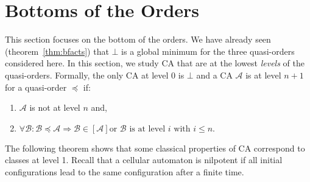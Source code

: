 \documentclass[a4paper]{elsarticle}
\newcommand{\ACA}{\mathcal{A}}
\newcommand{\ACB}{\mathcal{B}}
\newcommand{\simu}{\preccurlyeq}
\newcommand{\simc}[1]{\left[{#1}\right]}
\newcommand\sing{\bot}
\begin{document}
\section{Bottoms of the Orders}
\label{sec:bot}

This section focuses on the bottom of the orders.  We have already
seen (theorem~\ref{thm:bfacts}) that $\sing$ is a global minimum for
the three quasi-orders considered here. In this section, we study CA
that are at the lowest \emph{levels} of the quasi-orders.  Formally,
the only CA at level $0$ is $\sing$ and a CA $\ACA$ is at level
${n+1}$ for a quasi-order $\simu$ if:
\begin{enumerate}
\item $\ACA$ is not at level $n$ and,
\item ${\forall\ACB: \ACB\simu\ACA\Rightarrow \ACB\in\simc{\ACA}\text{
    or $\ACB$ is at level $i$ with ${i\leq n}$.}}$
\end{enumerate}

The following theorem shows that some classical properties of CA
correspond to classes at level 1.  Recall that a cellular automaton is
nilpotent if all initial configurations lead to the same configuration
after a finite time.
\end{document}
